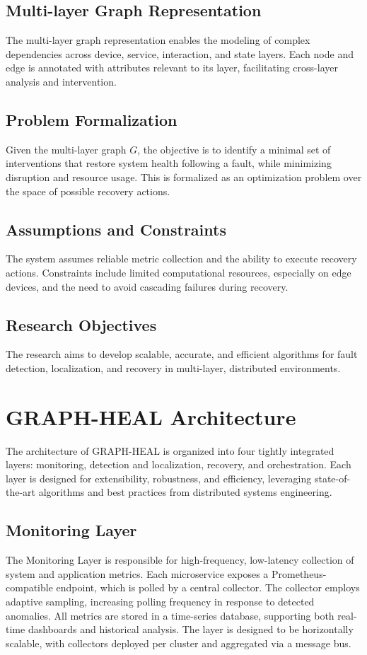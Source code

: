 \documentclass[11pt,twocolumn]{article}
\begin{document}
\subsection{Multi-layer Graph Representation}
The multi-layer graph representation enables the modeling of complex dependencies across device, service, interaction, and state layers. Each node and edge is annotated with attributes relevant to its layer, facilitating cross-layer analysis and intervention.

\subsection{Problem Formalization}
Given the multi-layer graph $G$, the objective is to identify a minimal set of interventions that restore system health following a fault, while minimizing disruption and resource usage. This is formalized as an optimization problem over the space of possible recovery actions.

\subsection{Assumptions and Constraints}
The system assumes reliable metric collection and the ability to execute recovery actions. Constraints include limited computational resources, especially on edge devices, and the need to avoid cascading failures during recovery.

\subsection{Research Objectives}
The research aims to develop scalable, accurate, and efficient algorithms for fault detection, localization, and recovery in multi-layer, distributed environments.
\section{GRAPH-HEAL Architecture}
The architecture of GRAPH-HEAL is organized into four tightly integrated layers: monitoring, detection and localization, recovery, and orchestration. Each layer is designed for extensibility, robustness, and efficiency, leveraging state-of-the-art algorithms and best practices from distributed systems engineering.

\subsection{ Monitoring Layer}
The Monitoring Layer is responsible for high-frequency, low-latency collection of system and application metrics. Each microservice exposes a Prometheus-compatible endpoint, which is polled by a central collector. The collector employs adaptive sampling, increasing polling frequency in response to detected anomalies. All metrics are stored in a time-series database, supporting both real-time dashboards and historical analysis. The layer is designed to be horizontally scalable, with collectors deployed per cluster and aggregated via a message bus.
\end{document}
